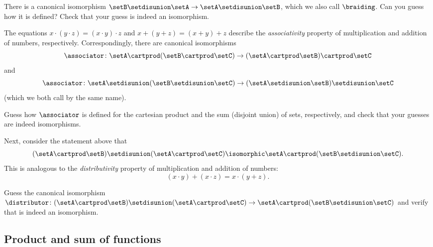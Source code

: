 \begin{exercise}\label{ex:braiding-disjoint-union}
There is a canonical isomorphism $\setB \setdisunion \setA \to \setA \setdisunion \setB$, which we also call $\braiding$. Can you guess how it is defined? Check that your guess is indeed an isomorphism. 
\end{exercise}

The equations $x \cdot (y \cdot z)  = (x \cdot y) \cdot z$ and $x + (y + z) = (x + y) + z$ describe the \emph{associativity} property of multiplication and addition of numbers, respectively. Correspondingly, there are canonical isomorphisms
\begin{equation}
\associator \colon  \setA \cartprod (\setB \cartprod \setC) \to (\setA \cartprod \setB) \cartprod \setC
\end{equation}
and 
\begin{equation}
\associator \colon \setA \setdisunion (\setB \setdisunion \setC) \to (\setA \setdisunion \setB) \setdisunion \setC 
\end{equation}
(which we both call by the same name). 

\begin{exercise}\label{ex:associator-cart-prod-and-disjoint-union}
Guess how $\associator$ is defined for the cartesian product and the sum (disjoint union) of sets, respectively, and check that your guesses are indeed isomorphisms.
\end{exercise}

Next, consider the statement above that 
\begin{equation}
(\setA \cartprod \setB) \setdisunion (\setA \cartprod \setC)  \isomorphic \setA \cartprod (\setB \setdisunion \setC).
\end{equation}
This is analogous to the \emph{distributivity} property of multiplication and addition of numbers:
\begin{equation}
(x \cdot y) + (x \cdot z)  = x \cdot (y + z).
\end{equation}

\begin{exercise}\label{ex:distributivity-isomorphism}
Guess the canonical isomorphism $\distributor \colon (\setA \cartprod \setB) \setdisunion (\setA \cartprod \setC) \to \setA \cartprod (\setB \setdisunion \setC)$ and verify that is indeed an isomorphism. 
\end{exercise}


\subsection{Product and sum of functions}
\label{sec:prod_dirsum_functions}

